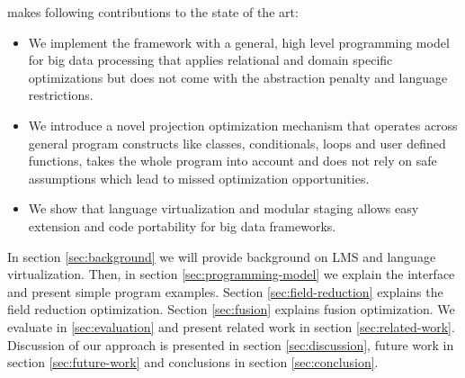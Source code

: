 \tool makes following contributions to the state of the art:    
\begin{itemize}

  \item We implement the \tool framework with a general, high level programming model for big data processing that applies relational and domain specific optimizations but does not come with the abstraction penalty and language restrictions.

  \item We introduce a novel projection optimization mechanism that operates across general program constructs like classes, conditionals, loops and user defined functions, takes the whole program into account and does not rely on safe assumptions which lead to missed optimization opportunities.


  \item We show that language virtualization and modular staging allows easy extension and code portability for big data frameworks. 
\end{itemize} 

In section \ref{sec:background} we will provide background on LMS and language virtualization. Then, in section \ref{sec:programming-model} we explain the interface and present simple program examples. Section \ref{sec:field-reduction} explains the field reduction optimization. Section \ref{sec:fusion} explains fusion optimization. We evaluate \tool in \ref{sec:evaluation} and present related work in section \ref{sec:related-work}. Discussion of our approach is presented in section \ref{sec:discussion}, future work in section \ref{sec:future-work} and conclusions in section \ref{sec:conclusion}.
